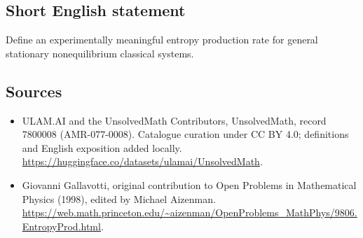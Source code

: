 \documentclass[11pt]{article}
\begin{document}
\subsection{Short English statement}
Define an experimentally meaningful entropy production rate for general stationary nonequilibrium classical systems.
\subsection{Sources}
\begin{itemize}
\item[\hypertarget{source:7800008:1}{S1}] ULAM.AI and the UnsolvedMath Contributors, UnsolvedMath, record 7800008 (AMR-077-0008). Catalogue curation under CC BY 4.0; definitions and English exposition added locally.
\url{https://huggingface.co/datasets/ulamai/UnsolvedMath}.
\item[\hypertarget{source:7800008:2}{S2}] Giovanni Gallavotti, original contribution to Open Problems in Mathematical Physics (1998), edited by Michael Aizenman.
\url{https://web.math.princeton.edu/~aizenman/OpenProblems_MathPhys/9806.EntropyProd.html}.
\end{itemize}
\label{end:7800008}
\end{document}
